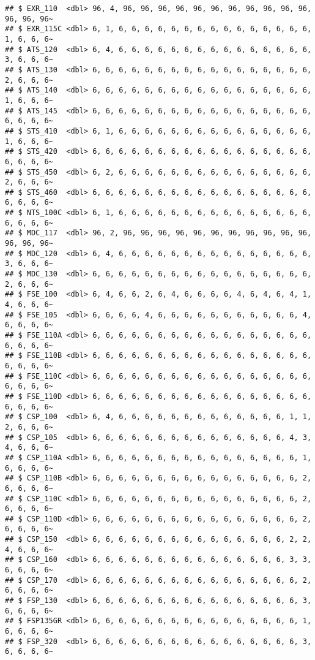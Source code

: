 \documentclass[
]{article}
\begin{document}
\begin{verbatim}
## $ EXR_110  <dbl> 96, 4, 96, 96, 96, 96, 96, 96, 96, 96, 96, 96, 96, 96, 96, 96~
## $ EXR_115C <dbl> 6, 1, 6, 6, 6, 6, 6, 6, 6, 6, 6, 6, 6, 6, 6, 6, 6, 1, 6, 6, 6~
## $ ATS_120  <dbl> 6, 4, 6, 6, 6, 6, 6, 6, 6, 6, 6, 6, 6, 6, 6, 6, 6, 3, 6, 6, 6~
## $ ATS_130  <dbl> 6, 6, 6, 6, 6, 6, 6, 6, 6, 6, 6, 6, 6, 6, 6, 6, 6, 2, 6, 6, 6~
## $ ATS_140  <dbl> 6, 6, 6, 6, 6, 6, 6, 6, 6, 6, 6, 6, 6, 6, 6, 6, 6, 1, 6, 6, 6~
## $ ATS_145  <dbl> 6, 6, 6, 6, 6, 6, 6, 6, 6, 6, 6, 6, 6, 6, 6, 6, 6, 6, 6, 6, 6~
## $ STS_410  <dbl> 6, 1, 6, 6, 6, 6, 6, 6, 6, 6, 6, 6, 6, 6, 6, 6, 6, 1, 6, 6, 6~
## $ STS_420  <dbl> 6, 6, 6, 6, 6, 6, 6, 6, 6, 6, 6, 6, 6, 6, 6, 6, 6, 6, 6, 6, 6~
## $ STS_450  <dbl> 6, 2, 6, 6, 6, 6, 6, 6, 6, 6, 6, 6, 6, 6, 6, 6, 6, 2, 6, 6, 6~
## $ STS_460  <dbl> 6, 6, 6, 6, 6, 6, 6, 6, 6, 6, 6, 6, 6, 6, 6, 6, 6, 6, 6, 6, 6~
## $ NTS_100C <dbl> 6, 1, 6, 6, 6, 6, 6, 6, 6, 6, 6, 6, 6, 6, 6, 6, 6, 6, 6, 6, 6~
## $ MDC_117  <dbl> 96, 2, 96, 96, 96, 96, 96, 96, 96, 96, 96, 96, 96, 96, 96, 96~
## $ MDC_120  <dbl> 6, 4, 6, 6, 6, 6, 6, 6, 6, 6, 6, 6, 6, 6, 6, 6, 6, 3, 6, 6, 6~
## $ MDC_130  <dbl> 6, 6, 6, 6, 6, 6, 6, 6, 6, 6, 6, 6, 6, 6, 6, 6, 6, 2, 6, 6, 6~
## $ FSE_100  <dbl> 6, 4, 6, 6, 2, 6, 4, 6, 6, 6, 6, 4, 6, 4, 6, 4, 1, 4, 6, 6, 6~
## $ FSE_105  <dbl> 6, 6, 6, 6, 4, 6, 6, 6, 6, 6, 6, 6, 6, 6, 6, 6, 4, 6, 6, 6, 6~
## $ FSE_110A <dbl> 6, 6, 6, 6, 6, 6, 6, 6, 6, 6, 6, 6, 6, 6, 6, 6, 6, 6, 6, 6, 6~
## $ FSE_110B <dbl> 6, 6, 6, 6, 6, 6, 6, 6, 6, 6, 6, 6, 6, 6, 6, 6, 6, 6, 6, 6, 6~
## $ FSE_110C <dbl> 6, 6, 6, 6, 6, 6, 6, 6, 6, 6, 6, 6, 6, 6, 6, 6, 6, 6, 6, 6, 6~
## $ FSE_110D <dbl> 6, 6, 6, 6, 6, 6, 6, 6, 6, 6, 6, 6, 6, 6, 6, 6, 6, 6, 6, 6, 6~
## $ CSP_100  <dbl> 6, 4, 6, 6, 6, 6, 6, 6, 6, 6, 6, 6, 6, 6, 6, 1, 1, 2, 6, 6, 6~
## $ CSP_105  <dbl> 6, 6, 6, 6, 6, 6, 6, 6, 6, 6, 6, 6, 6, 6, 6, 4, 3, 4, 6, 6, 6~
## $ CSP_110A <dbl> 6, 6, 6, 6, 6, 6, 6, 6, 6, 6, 6, 6, 6, 6, 6, 6, 1, 6, 6, 6, 6~
## $ CSP_110B <dbl> 6, 6, 6, 6, 6, 6, 6, 6, 6, 6, 6, 6, 6, 6, 6, 6, 2, 6, 6, 6, 6~
## $ CSP_110C <dbl> 6, 6, 6, 6, 6, 6, 6, 6, 6, 6, 6, 6, 6, 6, 6, 6, 2, 6, 6, 6, 6~
## $ CSP_110D <dbl> 6, 6, 6, 6, 6, 6, 6, 6, 6, 6, 6, 6, 6, 6, 6, 6, 2, 6, 6, 6, 6~
## $ CSP_150  <dbl> 6, 6, 6, 6, 6, 6, 6, 6, 6, 6, 6, 6, 6, 6, 6, 2, 2, 4, 6, 6, 6~
## $ CSP_160  <dbl> 6, 6, 6, 6, 6, 6, 6, 6, 6, 6, 6, 6, 6, 6, 6, 3, 3, 6, 6, 6, 6~
## $ CSP_170  <dbl> 6, 6, 6, 6, 6, 6, 6, 6, 6, 6, 6, 6, 6, 6, 6, 6, 2, 6, 6, 6, 6~
## $ FSP_130  <dbl> 6, 6, 6, 6, 6, 6, 6, 6, 6, 6, 6, 6, 6, 6, 6, 6, 3, 6, 6, 6, 6~
## $ FSP135GR <dbl> 6, 6, 6, 6, 6, 6, 6, 6, 6, 6, 6, 6, 6, 6, 6, 6, 1, 6, 6, 6, 6~
## $ FSP_320  <dbl> 6, 6, 6, 6, 6, 6, 6, 6, 6, 6, 6, 6, 6, 6, 6, 6, 3, 6, 6, 6, 6~

\end{verbatim}
\end{document}
